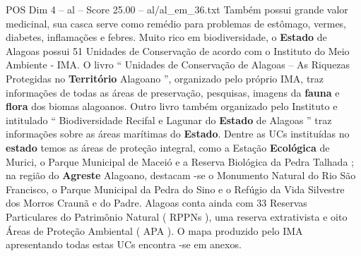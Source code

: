 \begin{textsample}{POS Dim 4 – al – Score 25.00 – al/al\_em\_36.txt}
Também possui grande valor medicinal, sua casca serve como remédio para problemas de estômago, vermes, diabetes, inflamações e febres.
Muito rico em biodiversidade, o \textbf{Estado} de Alagoas possui 51 Unidades de Conservação de acordo com o Instituto do Meio Ambiente - IMA.
O livro “ Unidades de Conservação de Alagoas – As Riquezas Protegidas no \textbf{Território} Alagoano ”, organizado pelo próprio IMA, traz informações de todas as áreas de preservação, pesquisas, imagens da \textbf{fauna} e \textbf{flora} dos biomas alagoanos.
Outro livro também organizado pelo Instituto e intitulado “ Biodiversidade Recifal e Lagunar do \textbf{Estado} de Alagoas ” traz informações sobre as áreas marítimas do \textbf{Estado}.
Dentre as UCs instituídas no \textbf{estado} temos as áreas de proteção integral, como a Estação \textbf{Ecológica} de Murici, o Parque Municipal de Maceió e a Reserva Biológica da Pedra Talhada ; na região do \textbf{Agreste} Alagoano, destacam -se o Monumento Natural do Rio São Francisco, o Parque Municipal da Pedra do Sino e o Refúgio da Vida Silvestre dos Morros Craunã e do Padre.
Alagoas conta ainda com 33 Reservas Particulares do Patrimônio Natural ( RPPNs ), uma reserva extrativista e oito Áreas de Proteção Ambiental ( APA ).
O mapa produzido pelo IMA apresentando todas estas UCs encontra -se em anexos.

\end{textsample}
